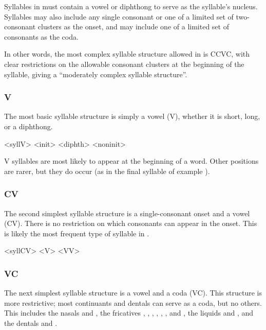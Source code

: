 Syllables in \lang{} must contain a vowel or diphthong to serve as the syllable's nucleus. Syllables may also include any single consonant or one of a limited set of two-consonant clusters as the onset, and may include one of a limited set of consonants as the coda.

In other words, the most complex syllable structure allowed in \lang{} is CCVC, with clear restrictions on the allowable consonant clusters at the beginning of the syllable, giving \lang{} a \enquote{moderately complex syllable structure}.\autocite{wals-12}

\subsubsection{V}

The most basic syllable structure is simply a vowel (V), whether it is short, long, or a diphthong.

\pex<syllV>
	\a<init>    
	\a<diphth>    
	\a<noninit>    
\xe

V syllables are most likely to appear at the beginning of a word. Other positions are rarer, but they do occur (as in the final syllable of example ).

\subsubsection{CV}

The second simplest syllable structure is a single-consonant onset and a vowel (CV). There is no restriction on which consonants can appear in the onset. This is likely the most frequent type of syllable in \lang{}.

\pex<syllCV>
	    
	\a<VV>    
\xe

\subsubsection{VC}

The next simplest syllable structure is a vowel and a coda (VC). This structure is more restrictive; most continuants and dentals can serve as a coda, but no others. This includes the nasals  and , the fricatives , , , , , , and , the liquids  and , and the dentals  and .

